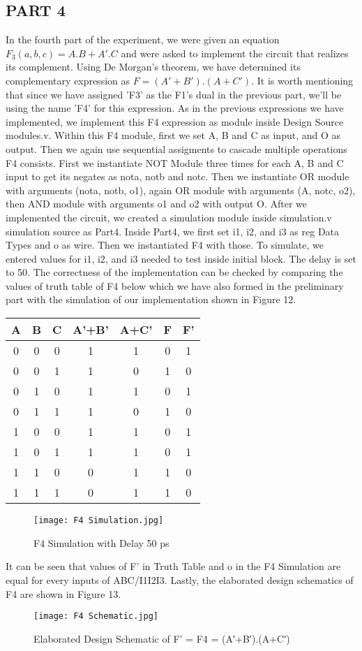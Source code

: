\documentclass[pdftex,12pt,a4paper]{article}
\begin{document}
\subsection{PART 4}
In the fourth part of the experiment, we were given an equation \(F_3(a,b,c) = A.B + A'.C\) and were asked to implement the circuit that realizes its complement. Using De Morgan's theorem, we have determined its complementary expression as \(F = (A′+B′).(A+C′)\). It is worth mentioning that since we have assigned 'F3' as the F1's dual in the previous part, we'll be using the name 'F4' for this expression. As in the previous expressions we have implemented, we implement this F4 expression as module inside Design Source modules.v. Within this F4 module, first we set A, B and C as input, and O as output. Then we again use sequential assigments to cascade multiple operations F4 consists. First we instantiate NOT Module three times for each A, B and C input to get its negates as nota, notb and notc. Then we instantiate OR module with arguments (nota, notb, o1), again OR module with arguments (A, notc, o2), then AND module with arguments o1 and o2 with output O. After we implemented the circuit, we created a simulation module inside simulation.v simulation source as Part4. Inside Part4, we first set i1, i2, and i3 as reg Data Types and o as wire. Then we instantiated F4 with those. To simulate, we entered values for i1, i2, and i3 needed to test inside initial block. The delay is set to 50. The correctness of the implementation can be checked by comparing the values of truth table of F4 below which we have also formed in the preliminary part with the simulation of our implementation shown in Figure 12.
\begin{center}
 \begin{tabular}{|c|c|c|c|c|c|c|} 
 \hline
 A & B & C & A'+B' & A+C' & F & F'  \\ 
 \hline\hline
 0 & 0 & 0 & 1 & 1 & 0 & 1 \\ 
 \hline
 0 & 0 & 1 & 1 & 0 & 1 & 0 \\
 \hline
 0 & 1 & 0 & 1 & 1 & 0 & 1 \\
 \hline
 0 & 1 & 1 & 1 & 0 & 1 & 0 \\
 \hline
 1 & 0 & 0 & 1 & 1 & 0 & 1 \\ 
 \hline
 1 & 0 & 1 & 1 & 1 & 0 & 1 \\ 
 \hline
 1 & 1 & 0 & 0 & 1 & 1 & 0 \\ 
 \hline
 1 & 1 & 1 & 0 & 1 & 1 & 0 \\ 
 \hline
\end{tabular}
\end{center}
\begin{figure}[ht]
	\centering
	\texttt{[image: F4 Simulation.jpg]}	
	\caption{F4 Simulation with Delay 50 ps}
	\label{fig1}
\end{figure}
It can be seen that values of F' in Truth Table and o in the F4 Simulation are equal for every inputs of ABC/I1I2I3. Lastly, the elaborated design schematics of F4 are shown in Figure 13. 
\begin{figure}[ht]
	\centering
	\texttt{[image: F4 Schematic.jpg]}	
	\caption{Elaborated Design Schematic of F' = F4 = (A′+B′).(A+C′)}
	\label{fig1}
\end{figure}
\end{document}
